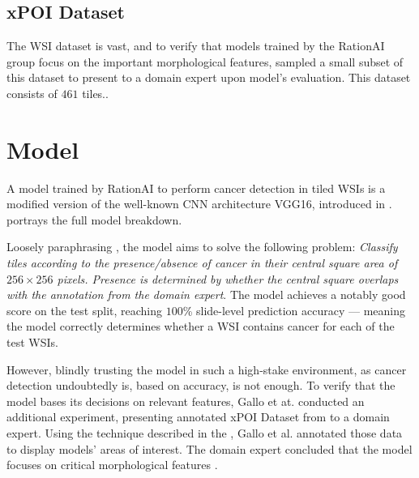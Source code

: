 \subsection*{xPOI Dataset}\label{xpoi-dataset}

The WSI dataset is vast, and to verify that models trained by the RationAI group focus on the important morphological features, \cite{gallo} sampled a small subset of this dataset to present to a domain expert upon model's evaluation.
This dataset consists of $461$ tiles..

\section{Model}\label{model}

A model trained by RationAI to perform cancer detection in tiled WSIs is a modified version of the well-known CNN architecture VGG16, introduced in \cite{vgg16}.
 portrays the full model breakdown.

Loosely paraphrasing \cite{gallo}, the model aims to solve the following problem: \emph{Classify tiles according to the presence/absence of cancer in their central square area of $256 \times 256 $ pixels. Presence is determined by whether the central square overlaps with the annotation from the domain expert}. The model achieves a notably good score on the test split, reaching $100$\% slide-level prediction accuracy --- meaning the model correctly determines whether a WSI contains cancer for each of the test WSIs.

However, blindly trusting the model in such a high-stake environment, as cancer detection undoubtedly is, based on accuracy, is not enough.
To verify that the model bases its decisions on relevant features,  Gallo et at. conducted an additional experiment, presenting annotated xPOI Dataset from  to a domain expert.
Using the technique described in the , Gallo et al. annotated those data to display models' areas of interest.
The domain expert concluded that the model focuses on critical morphological features \cite{gallo}.

